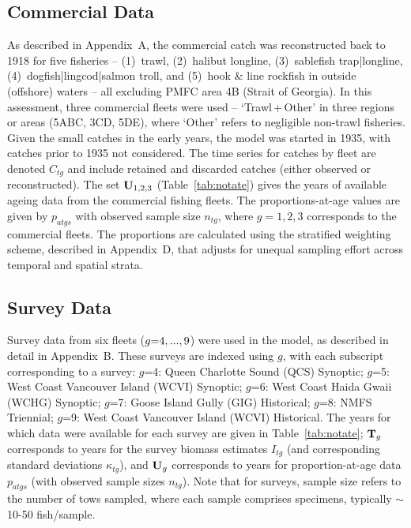 \documentclass[11pt]{book}
\newcommand{\AppCat}{Appendix~A}
\newcommand{\AppSurv}{Appendix~B}
\newcommand{\AppBio}{Appendix~D}
\begin{document}
\subsection{Commercial Data}

As described in \AppCat, the commercial catch was reconstructed back to 1918 for five fisheries -- (1)~trawl, (2)~halibut longline, (3)~sablefish trap|longline, (4)~dogfish|lingcod|salmon troll, and (5)~hook \& line rockfish in outside (offshore) waters -- all excluding PMFC area 4B (Strait of Georgia).
In this assessment, three commercial fleets were used -- `Trawl\,+\,Other' in three regions or areas (5ABC, 3CD, 5DE), where `Other' refers to negligible non-trawl fisheries.
Given the small catches in the early years, the model was started in 1935, with catches prior to 1935 not considered.
The time series for catches by fleet are denoted $C_{tg}$ and include retained and discarded catches (either observed or reconstructed). 
The set ${\bf U}_{1,2,3}$ (Table~\ref{tab:notate}) gives the years of available ageing data from the commercial fishing fleets.
The proportions-at-age values are given by $p_{atgs}$ with observed sample size $n_{tg}$, where $g=1,2,3$ corresponds to the commercial fleets.
The proportions are calculated using the stratified weighting scheme, described in \AppBio, that adjusts for unequal sampling effort across temporal and spatial strata.

\subsection{Survey Data} 
Survey data from six fleets ($g{=}4,...,9$) were used in the model, as described in detail in \AppSurv.
These surveys are indexed using $g$, with each subscript corresponding to a survey:  $g$=4: Queen Charlotte Sound (QCS) Synoptic;  $g$=5: West Coast Vancouver Island (WCVI) Synoptic;  $g$=6: West Coast Haida Gwaii (WCHG) Synoptic;  $g$=7: Goose Island Gully (GIG) Historical;  $g$=8: NMFS Triennial;  $g$=9: West Coast Vancouver Island (WCVI) Historical.
The years for which data were available for each survey are given in Table~\ref{tab:notate};
${\bf T}_g$ corresponds to years for the survey biomass estimates $I_{tg}$ (and corresponding standard deviations $\kappa_{tg}$), and ${\bf U}_g$ corresponds to years for proportion-at-age data $p_{atgs}$ (with observed sample sizes $n_{tg}$).
Note that for surveys, sample size refers to the number of tows sampled, where each sample comprises specimens, typically $\sim$10-50 fish/sample.
\end{document}
